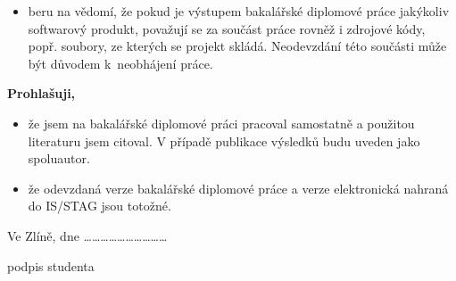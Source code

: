 {{\begin{itemize}
					\item{beru na vědomí, že pokud je výstupem \ifbp bakalářské \else \ifdp diplomové \fi \fi práce jakýkoliv softwarový produkt, považují se za součást práce rovněž i zdrojové kódy, popř. soubory, ze kterých se projekt skládá. Neodevzdání této součásti může být důvodem k~neobhájení práce.}
				\end{itemize}
				\medskip
				\textbf{Prohlašuji,}
				\begin{itemize}
					\setlength{\parskip}{0pt}
					\setlength{\itemsep}{0pt}
					\item{že jsem na \ifbp bakalářské \else \ifdp diplomové \fi \fi práci pracoval samostatně a použitou literaturu jsem citoval. V případě publikace výsledků budu uveden jako spoluautor.}
					\item{že odevzdaná verze \ifbp bakalářské \else \ifdp diplomové \fi \fi práce a verze elektronická nahraná do IS/STAG jsou totožné.}
				\end{itemize}
				\medskip
				Ve Zlíně, dne \hspace{6.5cm}\dots\dots\dots\dots\dots\dots\dots\dots\dots\dots

				\hspace{10.3cm}podpis studenta

}}
